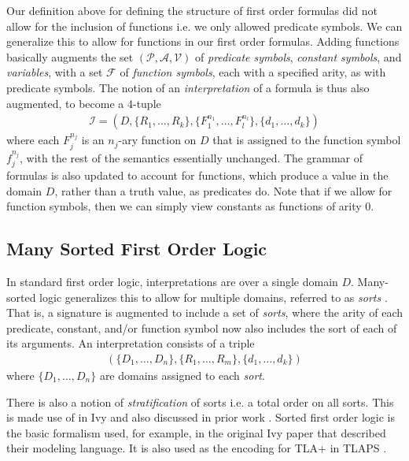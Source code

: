\documentclass[10pt]{article}
\begin{document}
Our definition above for defining the structure of first order formulas did not allow for the inclusion of functions i.e. we only allowed predicate symbols. We can generalize this to allow for functions in our first order formulas. Adding functions basically augments the set $(\mathcal{P}, \mathcal{A}, \mathcal{V})$ of \textit{predicate symbols}, \textit{constant symbols}, and \textit{variables}, with a set $\mathcal{F}$ of \textit{function symbols}, each with a specified arity, as with predicate symbols. The notion of an \textit{interpretation} of a formula is thus also augmented, to become a 4-tuple
\begin{align*}
    \mathcal{I} = (D, \{R_1,\dots, R_k\},  \{F_1^{n_1},\dots, F_l^{n_l}\}, \{d_1,\dots,d_k\})
\end{align*}
where each $F_j^{n_j}$ is an $n_j$-ary function on $D$ that is assigned to the function symbol $f_j^{n_j}$, with the rest of the semantics essentially unchanged. The grammar of formulas is also updated to account for functions, which produce a value in the domain $D$, rather than a truth value, as predicates do. Note that if we allow for function symbols, then we can simply view constants as functions of arity 0.

\subsection{Many Sorted First Order Logic}

In standard first order logic, interpretations are over a single domain $D$. Many-sorted logic generalizes this to allow for multiple domains, referred to as \textit{sorts} \cite{2014manysortedlogic}. That is, a signature is augmented to include a set of \textit{sorts}, where the arity of each predicate, constant, and/or function symbol now also includes the sort of each of its arguments. An interpretation consists of a triple
\begin{align*}
    (\{D_1,\dots,D_n\}, \{R_1,\dots, R_m\},\{d_1,\dots,d_k\})
\end{align*}  
where $\{D_1,\dots,D_n\}$ are domains assigned to each \textit{sort}.

There is also a notion of \textit{stratification} 
of sorts i.e. a total order on all sorts. This is made use of in Ivy \cite{2020ivymultimodal} and also discussed in prior work \cite{2007decidablefragmentsmanysorted, 2009completeinstant}. Sorted first order logic is the basic formalism used, for example, in the original Ivy paper \cite{padon2016ivy} that described their modeling language. It is also used as the encoding for TLA+ in TLAPS \cite{2016merzmanysorted}.
\end{document}
